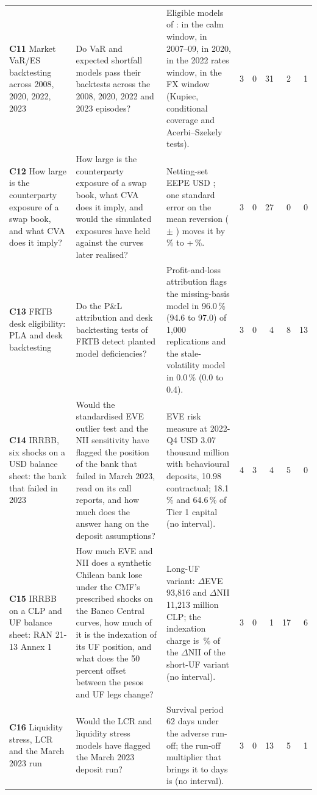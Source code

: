 {\begin{longtable}{>{\raggedright\arraybackslash}p{2.6cm}>{\raggedright\arraybackslash}p{3.7cm}>{\raggedright\arraybackslash}p{5.7cm}rrrrr}
\textbf{C11} Market VaR/ES backtesting across 2008, 2020, 2022, 2023 & Do VaR and expected shortfall models pass their backtests across the 2008, 2020, 2022 and 2023 episodes? & Eligible models of \mkNModels{}: \mkEligCalm{} in the calm window, \mkEligGfc{} in 2007--09, \mkEligCovid{} in 2020, \mkEligRates{} in the 2022 rates window, \mkEligFx{} in the FX window (Kupiec, conditional coverage and Acerbi--Szekely tests). & 3 & 0 & 31 & 2 & 1 \\
\textbf{C12} How large is the counterparty exposure of a swap book, and what CVA does it imply? & How large is the counterparty exposure of a swap book, what CVA does it imply, and would the simulated exposures have held against the curves later realised? & Netting-set EEPE USD \ccrEepeNetting{}; one standard error on the mean reversion (\ccrHwA{} $\pm$ \ccrHwASe{}) moves it by \ccrEepeAPlusPct{}\,\% to +\ccrEepeAMinusPct{}\,\%. & 3 & 0 & 27 & 0 & 0 \\
\textbf{C13} FRTB desk eligibility: PLA and desk backtesting & Do the P\&L attribution and desk backtesting tests of FRTB detect planted model deficiencies? & Profit-and-loss attribution flags the missing-basis model in 96.0\,\% (94.6 to 97.0) of 1{,}000 replications and the stale-volatility model in 0.0\,\% (0.0 to 0.4). & 3 & 0 & 4 & 8 & 13 \\
\textbf{C14} IRRBB, six shocks on a USD balance sheet: the bank that failed in 2023 & Would the standardised EVE outlier test and the NII sensitivity have flagged the position of the bank that failed in March 2023, read on its call reports, and how much does the answer hang on the deposit assumptions? & EVE risk measure at 2022-Q4 USD 3.07 thousand million with behavioural deposits, 10.98 contractual; 18.1\,\% and 64.6\,\% of Tier 1 capital (no interval). & 4 & 3 & 4 & 5 & 0 \\
\textbf{C15} IRRBB on a CLP and UF balance sheet: RAN 21-13 Annex 1 & How much EVE and NII does a synthetic Chilean bank lose under the CMF's prescribed shocks on the Banco Central curves, how much of it is the indexation of its UF position, and what does the 50 percent offset between the pesos and UF legs change? & Long-UF variant: $\Delta$EVE 93{,}816 and $\Delta$NII 11{,}213 million CLP; the indexation charge is \pxSevenShare{}\,\% of the $\Delta$NII of the short-UF variant (no interval). & 3 & 0 & 1 & 17 & 6 \\
\textbf{C16} Liquidity stress, LCR and the March 2023 run & Would the LCR and liquidity stress models have flagged the March 2023 deposit run? & Survival period 62 days under the adverse run-off; the run-off multiplier that brings it to \pxElevenTarget{} days is \pxElevenAdverse{} (no interval). & 3 & 0 & 13 & 5 & 1 \\

\end{longtable}}

